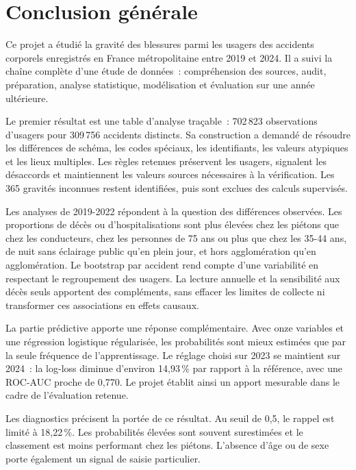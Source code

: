 \chapter*{Conclusion générale}
{}

Ce projet a étudié la gravité des blessures parmi les usagers des accidents corporels
enregistrés en France métropolitaine entre 2019 et 2024. Il a suivi la chaîne complète
d'une étude de données~: compréhension des sources, audit, préparation, analyse
statistique, modélisation et évaluation sur une année ultérieure.

Le premier résultat est une table d'analyse traçable~: 702\,823 observations d'usagers
pour 309\,756 accidents distincts. Sa construction a demandé de résoudre les différences
de schéma, les codes spéciaux, les identifiants, les valeurs atypiques et les lieux
multiples. Les règles retenues préservent les usagers, signalent les désaccords et
maintiennent les valeurs sources nécessaires à la vérification. Les 365 gravités
inconnues restent identifiées, puis sont exclues des calculs supervisés.

Les analyses de 2019-2022 répondent à la question des différences observées. Les
proportions de décès ou d'hospitalisations sont plus élevées chez les piétons que chez
les conducteurs, chez les personnes de 75 ans ou plus que chez les 35-44 ans, de nuit
sans éclairage public qu'en plein jour, et hors agglomération qu'en agglomération.
Le bootstrap par accident rend compte d'une variabilité en respectant le regroupement
des usagers. La lecture annuelle et la sensibilité aux décès seuls apportent des
compléments, sans effacer les limites de collecte ni transformer ces associations
en effets causaux.

La partie prédictive apporte une réponse complémentaire. Avec onze variables et une
régression logistique régularisée, les probabilités sont mieux estimées que par la
seule fréquence de l'apprentissage. Le réglage choisi sur 2023 se maintient sur
2024~: la log-loss diminue d'environ 14,93\,\% par rapport à la référence, avec une
ROC-AUC proche de 0,770. Le projet établit ainsi un apport mesurable dans le cadre
de l'évaluation retenue.

Les diagnostics précisent la portée de ce résultat. Au seuil de 0,5, le rappel est
limité à 18,22\,\%. Les probabilités élevées sont souvent surestimées et le classement
est moins performant chez les piétons. L'absence d'âge ou de sexe porte également un
signal de saisie particulier.

